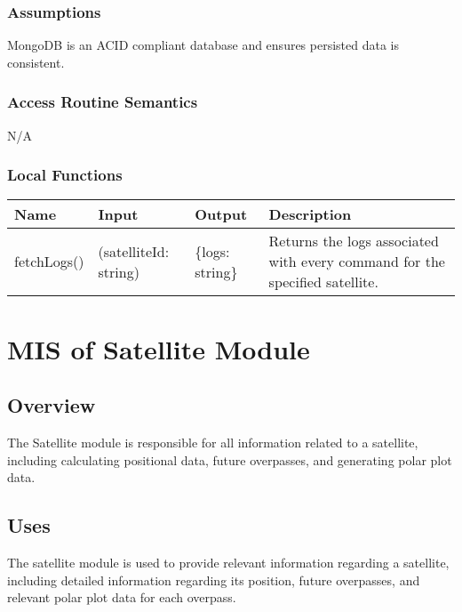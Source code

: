 \documentclass[12pt, titlepage]{article}
\begin{document}
\subsubsection{ Assumptions}

MongoDB is an ACID compliant database and ensures persisted data is consistent.

\subsubsection{ Access Routine Semantics}

N/A

\subsubsection{ Local Functions}
\begin{center}
\begin{tabular}{p{2cm} p{4cm} p{4cm} p{4cm}}
\hline
\textbf{Name} & \textbf{Input} & \textbf{Output} & \textbf{Description} \\
\hline
fetchLogs() & (satelliteId: string) & \{logs: string\} & Returns the logs associated with every command for the specified satellite. \\
\hline
\end{tabular}
\end{center}


 
\section{MIS of {Satellite Module}} \label{Module} 

\subsection{Overview}

The Satellite module is responsible for all information related to a satellite, including calculating positional data, future overpasses, and generating polar plot data. 

\subsection{Uses}

The satellite module is used to provide relevant information regarding a satellite, including detailed information regarding its position, future overpasses, and relevant polar plot data for each overpass.
\end{document}

